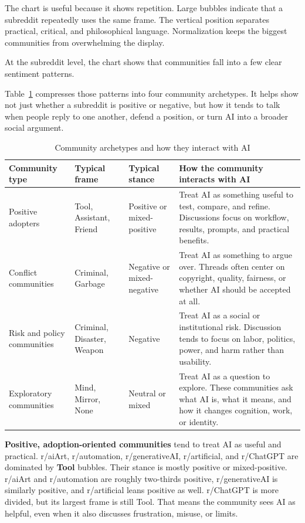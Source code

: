 \documentclass[11pt]{article}
\begin{document}
The chart is useful because it shows repetition. Large bubbles indicate that a subreddit repeatedly uses the same frame. The vertical position separates practical, critical, and philosophical language. Normalization keeps the biggest communities from overwhelming the display.

At the subreddit level, the chart shows that communities fall into a few clear sentiment patterns.

Table~\ref{tab:communitytypes} compresses those patterns into four community archetypes. It helps show not just whether a subreddit is positive or negative, but how it tends to talk when people reply to one another, defend a position, or turn AI into a broader social argument.

\begin{table}[H]
\centering
\caption{Community archetypes and how they interact with AI}
\label{tab:communitytypes}
\begin{tabular}{p{2.8cm} p{2.2cm} p{2.1cm} p{6.1cm}}
\toprule
Community type & Typical frame & Typical stance & How the community interacts with AI \\
\midrule
Positive adopters & Tool, Assistant, Friend & Positive or mixed-positive & Treat AI as something useful to test, compare, and refine. Discussions focus on workflow, results, prompts, and practical benefits. \\
Conflict communities & Criminal, Garbage & Negative or mixed-negative & Treat AI as something to argue over. Threads often center on copyright, quality, fairness, or whether AI should be accepted at all. \\
Risk and policy communities & Criminal, Disaster, Weapon & Negative & Treat AI as a social or institutional risk. Discussion tends to focus on labor, politics, power, and harm rather than usability. \\
Exploratory communities & Mind, Mirror, None & Neutral or mixed & Treat AI as a question to explore. These communities ask what AI is, what it means, and how it changes cognition, work, or identity. \\
\bottomrule
\end{tabular}
\end{table}

\textbf{Positive, adoption-oriented communities} tend to treat AI as useful and practical. r/aiArt, r/automation, r/generativeAI, r/artificial, and r/ChatGPT are dominated by \textbf{Tool} bubbles. Their stance is mostly positive or mixed-positive. r/aiArt and r/automation are roughly two-thirds positive, r/generativeAI is similarly positive, and r/artificial leans positive as well. r/ChatGPT is more divided, but its largest frame is still Tool. That means the community sees AI as helpful, even when it also discusses frustration, misuse, or limits.
\end{document}
